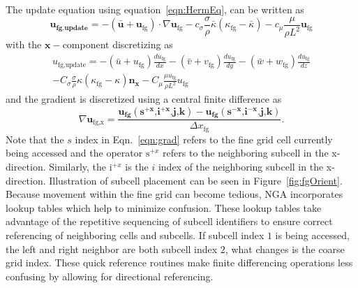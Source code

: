 The update equation using equation~\ref{eqn:HermEq},  can be written as 
\begin{equation}
\bm{u_{\text{fg,update}}}= 
-(\bar{\bm{u}}+\bm{u}_{\text{fg}}) \cdot \nabla \bm{u}_{\text{fg}} 
-c_{\sigma}\frac{\sigma}{\rho}\bar{\kappa}(\kappa_{\text{fg}}-\bar{\kappa})- 
c_{\mu}\frac{\mu}{\rho L^2}\bm{u}_{\text{fg}}
\label{eqn:update}
\end{equation}
with the $\bm{x}-$component discretizing as 
\begin{multline}
{u_{\text{fg,update}}}=
- ( \bar{{u}} + {u_{\text{fg}}} ) \frac{d{u_{\text{fg}}}   } { dx} 
- ( \bar{{v}} + {v_{\text{fg}}}     ) \frac{d{u_{\text{fg}}}   } { dy}
- ( \bar{{w}} + {w_{\text{fg}}}    ) \frac{d{u_{\text{fg}}}   } { dz}  \\
- C_{\sigma}\frac{\sigma}{\rho}\kappa(\kappa_{\text{fg}}-\kappa)\bm{n_{\text{x}}} 
- C_{\mu} \frac{\mu {u_{\text{fg}}}}{\rho L^2}  {u_{\text{fg}}}
\end{multline}
and the gradient is discretized using a central finite difference as  
	\begin{equation}
	\nabla \bm{u}_{\text{fg,x}}  =
	\frac{\bm{u_{\text{fg}  }(\text{s$^{+x}$,i$^{+x}$,j,k}) - \bm{u_{\text{fg}  }(\text{s$^{-x}$,i$^{-x}$,j,k})} }}  {  \Delta x_{\text{fg}  }}.
	\label{eqn:grad}
	\end{equation}
 Note that the $s$ index in Eqn.~\ref{eqn:grad} refers to the fine grid cell currently being accessed and the operator $\text{s$^{+x}$}$ refers to the neighboring subcell in the x-direction. Similarly, the $\text{i$^{+x}$}$ is the $i$ index of the neighboring subcell in the x-direction. Illustration of subcell placement can be seen in Figure~\ref{fig:fgOrient}. Because movement within the fine grid can become tedious, NGA incorporates lookup tables which help to minimize confusion. These lookup tables take advantage of the repetitive sequencing of subcell identifiers to ensure correct referencing of neighboring cells and subcells. If subcell index $1$ is being accessed, the left and right neighbor are both subcell index $2$, what changes is the coarse grid index. These quick reference routines make finite differencing operations less confusing by allowing for directional referencing. 
